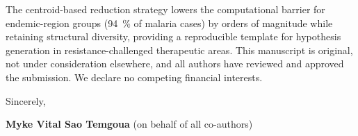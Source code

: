 \documentclass[9pt,letterpaper]{article}
\begin{document}
The centroid-based reduction strategy lowers the computational barrier for endemic-region groups (\qty{94}{\percent} of malaria cases) by orders of magnitude while retaining structural diversity, providing a reproducible template for hypothesis generation in resistance-challenged therapeutic areas. This manuscript is original, not under consideration elsewhere, and all authors have reviewed and approved the submission. We declare no competing financial interests.

\vspace{0.3em}

\noindent Sincerely,

\noindent \textbf{Myke Vital Sao Temgoua} (on behalf of all co-authors)
\end{document}
